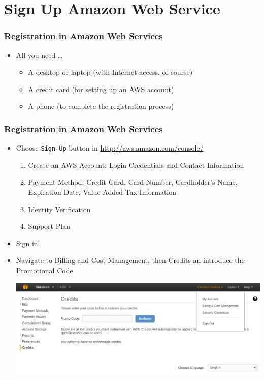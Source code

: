 \documentclass{beamer}
\begin{document}
\section{Sign Up Amazon Web Service}
\begin{frame}[fragile]
\frametitle{Registration in Amazon Web Services}
\begin{itemize}
 \item All you need \dots
 \begin{itemize}
   \item A desktop or laptop (with Internet access, of course)
   \item A credit card (for setting up an AWS account)
   \item A phone (to complete the registration process)
 \end{itemize}
\end{itemize}
\end{frame}
\begin{frame}
\frametitle{Registration in Amazon Web Services}
\begin{itemize}
\item Choose \texttt{Sign Up} button in \url{http://aws.amazon.com/console/} 
\begin{enumerate}
 \item  Create an AWS Account: Login Credentials and Contact Information
  \item Payment Method: Credit Card, Card Number, Cardholder's Name, Expiration Date, Value Added Tax Information
  \item Identity Verification
  \item Support Plan
 \end{enumerate}

\item Sign in!
\item Navigate to Billing and Cost Management, then Credits an introduce the Promotional Code
\begin{center}
\includegraphics[scale=0.25]{credits.png}
\end{center}
\end{itemize}

\end{frame}
\end{document}
